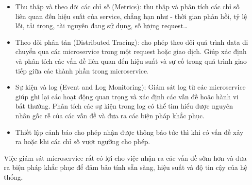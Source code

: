 \documentclass[report.tex]{subfiles}
\begin{document}
\begin{itemize}[noitemsep]
  \item Thu thập và theo dõi các chỉ số (Metrics): thu thập và phân tích các chỉ số liên quan đến hiệu suất của service, chẳng hạn như - thời gian phản hồi, tỷ lệ lỗi, tải trọng, tài nguyên đang sử dụng, số lượng request\dots
  \item Theo dõi phân tán (Distributed Tracing): cho phép theo dõi quá trình data di chuyển qua các microservice trong một request hoặc giao dịch.
Giúp xác định và phân tích các vấn đề liên quan đến hiệu suất và sự cố trong quá trình giao tiếp giữa các thành phần trong microservice.
  \item Sự kiện và log (Event and Log Monitoring): Giám sát log từ các microservice giúp ghi lại các hoạt động quan trọng và xác định các vấn đề hoặc hành vi bất thường.
Phân tích các sự kiện trong log có thể tìm hiểu được nguyên nhân gốc rễ của các vấn đề và đưa ra các biện pháp khắc phục.
  \item Thiết lập cảnh báo cho phép nhận được thông báo tức thì khi có vấn đề xảy ra hoặc khi các chỉ số vượt ngưỡng cho phép.
\end{itemize}

Việc giám sát microservice rất có lợi cho việc nhận ra các vấn đề sớm hơn và đưa ra biện pháp khắc phục
để đảm bảo tính sẵn sàng, hiệu suất và độ tin cậy của hệ thống.
\end{document}
